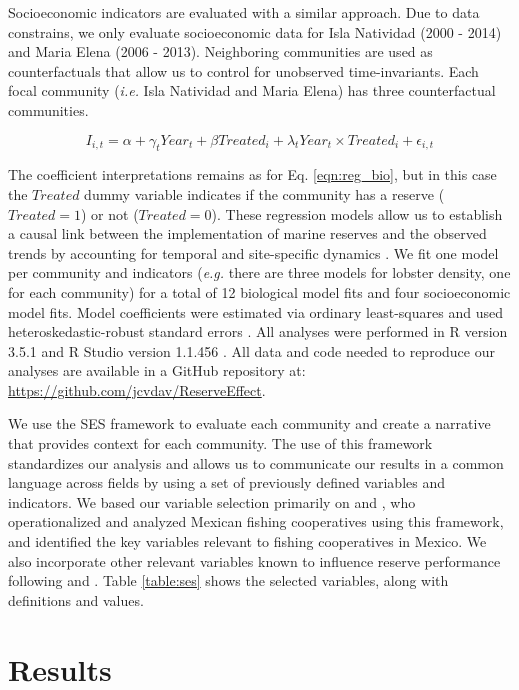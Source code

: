 \documentclass{frontiersSCNS}
\begin{document}
Socioeconomic indicators are evaluated with a similar approach. Due to
data constrains, we only evaluate socioeconomic data for Isla Natividad
(2000 - 2014) and Maria Elena (2006 - 2013). Neighboring communities are
used as counterfactuals that allow us to control for unobserved
time-invariants. Each focal community (\emph{i.e.} Isla Natividad and
Maria Elena) has three counterfactual communities.

\begin{equation}
I_{i,t} = \alpha + \gamma_{t} Year_t + \beta Treated_i + \lambda_{t} Year_t\times Treated_i +\epsilon_{i,t}
\label{eqn:soc_reg}
\end{equation}

The coefficient interpretations remains as for Eq. \ref{eqn:reg_bio},
but in this case the \(Treated\) dummy variable indicates if the
community has a reserve (\(Treated = 1\)) or not (\(Treated = 0\)).
These regression models allow us to establish a causal link between the
implementation of marine reserves and the observed trends by accounting
for temporal and site-specific dynamics \citep{depalma_2018}. We fit one
model per community and indicators (\emph{e.g.} there are three models
for lobster density, one for each community) for a total of 12
biological model fits and four socioeconomic model fits. Model
coefficients were estimated via ordinary least-squares and used
heteroskedastic-robust standard errors \citep{zeileis_2004-7n}. All
analyses were performed in R version 3.5.1 and R Studio version 1.1.456
\citep{R_2018}. All data and code needed to reproduce our analyses are
available in a GitHub repository at:
\url{https://github.com/jcvdav/ReserveEffect}.

We use the SES framework to evaluate each community and create a
narrative that provides context for each community. The use of this
framework standardizes our analysis and allows us to communicate our
results in a common language across fields by using a set of previously
defined variables and indicators. We based our variable selection
primarily on \citet{leslie_2015-na} and \citet{basurto_2013-oq}, who
operationalized and analyzed Mexican fishing cooperatives using this
framework, and identified the key variables relevant to fishing
cooperatives in Mexico. We also incorporate other relevant variables
known to influence reserve performance following
\citet{difranco_2016-Xw} and \citet{edgar_2014-UO}. Table
\ref{table:ses} shows the selected variables, along with definitions and
values.

\hypertarget{results}{%
\section{Results}\label{results}}
\end{document}
